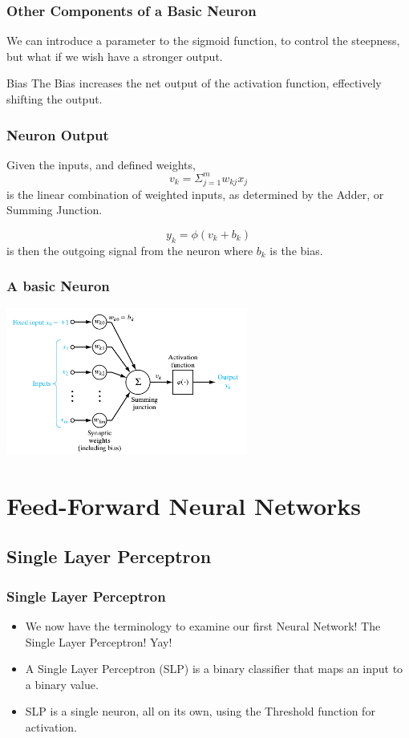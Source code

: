 \documentclass{beamer}
\begin{document}
\begin{frame}
\frametitle{Other Components of a Basic Neuron}
We can introduce a parameter to the sigmoid function, to control the steepness, but what if we wish have a stronger output.
\begin{block}{Bias}
The Bias increases the net output of the activation function, effectively shifting the output.
\end{block}

\end{frame}

\begin{frame}
\frametitle{Neuron Output}
Given the inputs, and defined weights, 
$$v_k=\Sigma_{j=1}^{m}w_{kj}x_j$$ is the linear combination of weighted inputs, as determined by the Adder, or Summing Junction.

$$y_k = \phi(v_k+b_k)$$ is then the outgoing signal from the neuron where $b_k$ is the bias.


\end{frame}
\begin{frame}
\frametitle{A basic Neuron}
\includegraphics[width=300px]{neurond.png}
\end{frame}

\section{Feed-Forward Neural Networks}


\subsection{Single Layer Perceptron}
\begin{frame}
\frametitle{Single Layer Perceptron}
\begin{itemize}
\item We now have the terminology to examine our first Neural Network! The Single Layer Perceptron! Yay!

\item A Single Layer Perceptron (SLP) is a binary classifier that maps an input to a binary value.
\item SLP is a single neuron, all on its own, using the Threshold function for activation.
\end{itemize}
\end{frame}
\end{document}
